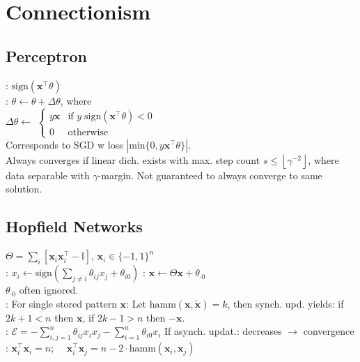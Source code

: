 \section{Connectionism}
\subsection*{Perceptron}
: $\text{sign}(\mathbf{x}^{\top}\theta)$ \\
: $\theta \leftarrow \theta + \Delta \theta$, where \\
$\Delta \theta  \xleftarrow[]{}$
    $\begin{cases}
    y\mathbf{x} &\text{if } y \; \text{sign}(\mathbf{x}^{\top}\theta) < 0\\
    0 & \text{otherwise}
    \end{cases}$\\
Corresponds to SGD w loss $|\text{min}\{0, y\mathbf{x}^{\top} \theta \}|$. \\
Always converges if linear dich. exists with max. step count $s \leq \left \lfloor{\gamma^{-2}}\right \rfloor $, where data separable with $\gamma$-margin. Not guaranteed to always converge to same solution.

\subsection*{Hopfield Networks}
$\Theta = \sum_i \left[ \mathbf{x}_i \mathbf{x}_i^{\top} - \mathbb{I} \right]$, $\mathbf{x}_i \in \{ -1, 1\}^n$ \\
: $x_i \leftarrow \text{sign}( \sum_{j \neq i} \theta_{ij} x_j + \theta_{i0})$
: $\mathbf{x} \leftarrow \Theta \mathbf{x} + \theta_{\cdot 0}$\\
$\theta_{\cdot 0}$ often ignored.\\
: For single stored pattern $\mathbf{x}$: Let $\text{hamm}(\mathbf{x}, \mathbf{\tilde{x}}) = k$, then synch. upd. yields: if $2k + 1 < n$ then $\mathbf{x}$, if $2k - 1 > n$ then $-\mathbf{x}$. \\
: $\mathcal{E} = - \sum_{i,j = 1}^n \theta_{ij}x_ix_j - \sum_{i = 1}^n \theta_{i0}x_i$ 
If asynch. updat.: decreases $\rightarrow$ convergence \\
: $\mathbf{x}_i^{\top} \mathbf{x}_i = n$; $\quad \mathbf{x}_i^{\top} \mathbf{x}_j = n - 2 \cdot \text{hamm}(\mathbf{x}_i, \mathbf{x}_j)$

